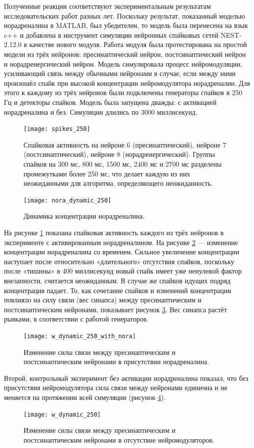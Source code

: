 Полученные реакции соответствуют экспериментальным результатам исследовательских работ разных лет.\cite{viljoen, delaneytransmission, macaca} Поскольку результат, показанный моделью норадреналина в MATLAB, был убедителен, то модель была перенесена на язык c++ и добавлена в инструмент симуляции нейронных спайковых сетей NEST-2.12.0 в качестве нового модуля. Работа модуля была протестирована на простой модели из трёх нейронов: пресинаптический нейрон, постсинаптический нейрон и норадренергический нейрон. Модель симулировала процесс нейромодуляции, усиливающий связь между обычными нейронами в случае, если между ними произошёл спайк при высокой концентрации нейромодулятора норадреналин. Для этого к каждому из трёх нейронов были подключены генераторы спайков в 250 Гц и детекторы спайков. Модель была запущена дважды: с активацией норадреналина и без. Симуляции длились по 3000 миллисекунд.


\begin{figure}
	\centering
	\texttt{[image: spikes\_250]}
	\caption{Спайковая активность на нейроне 6 (пресинаптический), нейроне 7 (постсинаптический), нейроне 8 (норадренергический). Группы спайков на 300 мс, 800 мс, 1500 мс, 2400 мс и 2700 мс разделены промежутками более 250 мс, что делает каждую из них неожиданными для алгоритма, определяющего неожиданность.}
	\label{fig:s_250}
\end{figure}

\begin{figure}
	\centering
	\texttt{[image: nora\_dynamic\_250]}
	\caption{Динамика концентрации норадреналина.}
	\label{fig:nora_dynamic_250}
\end{figure}


На рисунке \ref{fig:s_250} показана спайковая активность каждого из трёх нейронов в эксперименте с активированным норадреналином. На рисунке \ref{fig:nora_dynamic_250} — изменение концентрации норадреналина со временем. Сильное увеличение концентрации наступает после относительно «длительного» отсутствия спайков, поскольку после «тишины» в 400 миллисекунд новый спайк имеет уже ненулевой фактор внезапности, считается неожиданным. В случае же спайков идущих подряд концентрация падает. То, как сочетание спайков и изменений концентрации повлияло на силу связи (вес синапса) между пресинаптическим и постсинаптическим нейронами, показывает рисунок \ref{fig:w_250}. Вес синапса растёт рывками, в соответствии с работой генераторов.

\begin{figure}
	\centering
	\texttt{[image: w\_dynamic\_250\_with\_nora]}
	\caption{Изменение силы связи между пресинаптическим и постсинаптическим нейронами в присутствии норадреналина.}
	\label{fig:w_250}
\end{figure}

Второй, контрольный эксперимент без активации норадреналина показал, что без присутствия нейромодулятора сила связи между нейронами единична и не меняется на протяжении всей симуляции (рисунок \ref{fig:w_no_nora}).

\begin{figure}
	\centering
	\texttt{[image: w\_dynamic\_250]}
	\caption{Изменение силы связи между пресинаптическим и постсинаптическим нейронами в отсутствие нейромодуляторов.}
	\label{fig:w_no_nora}
\end{figure}